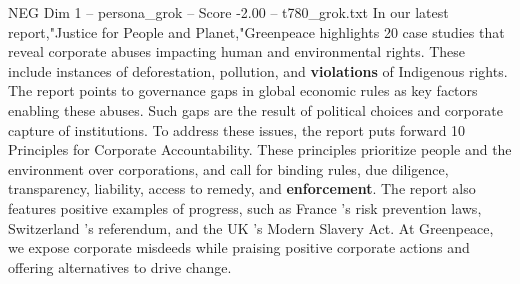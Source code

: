 \begin{textsample}{NEG Dim 1 – persona\_grok – Score -2.00 – t780\_grok.txt}  \label{ex:f1_neg_023}
In our latest report,"Justice for People and Planet,"Greenpeace highlights 20 case studies that reveal corporate abuses impacting human and environmental rights.
These include instances of deforestation, pollution, and \textbf{violations} of Indigenous rights.
The report points to governance gaps in global economic rules as key factors enabling these abuses.
Such gaps are the result of political choices and corporate capture of institutions.
To address these issues, the report puts forward 10 Principles for Corporate Accountability.
These principles prioritize people and the environment over corporations, and call for binding rules, due diligence, transparency, liability, access to remedy, and \textbf{enforcement}.
The report also features positive examples of progress, such as France 's risk prevention laws, Switzerland 's referendum, and the UK 's Modern Slavery Act.
At Greenpeace, we expose corporate misdeeds while praising positive corporate actions and offering alternatives to drive change.

\end{textsample}
